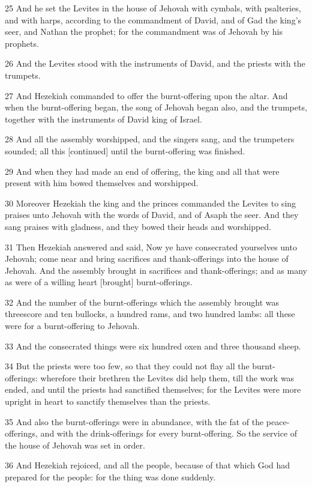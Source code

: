 \par 25 And he set the Levites in the house of Jehovah with cymbals, with psalteries, and with harps, according to the commandment of David, and of Gad the king's seer, and Nathan the prophet; for the commandment was of Jehovah by his prophets.
\par 26 And the Levites stood with the instruments of David, and the priests with the trumpets.
\par 27 And Hezekiah commanded to offer the burnt-offering upon the altar. And when the burnt-offering began, the song of Jehovah began also, and the trumpets, together with the instruments of David king of Israel.
\par 28 And all the assembly worshipped, and the singers sang, and the trumpeters sounded; all this [continued] until the burnt-offering was finished.
\par 29 And when they had made an end of offering, the king and all that were present with him bowed themselves and worshipped.
\par 30 Moreover Hezekiah the king and the princes commanded the Levites to sing praises unto Jehovah with the words of David, and of Asaph the seer. And they sang praises with gladness, and they bowed their heads and worshipped.
\par 31 Then Hezekiah answered and said, Now ye have consecrated yourselves unto Jehovah; come near and bring sacrifices and thank-offerings into the house of Jehovah. And the assembly brought in sacrifices and thank-offerings; and as many as were of a willing heart [brought] burnt-offerings.
\par 32 And the number of the burnt-offerings which the assembly brought was threescore and ten bullocks, a hundred rams, and two hundred lambs: all these were for a burnt-offering to Jehovah.
\par 33 And the consecrated things were six hundred oxen and three thousand sheep.
\par 34 But the priests were too few, so that they could not flay all the burnt-offerings: wherefore their brethren the Levites did help them, till the work was ended, and until the priests had sanctified themselves; for the Levites were more upright in heart to sanctify themselves than the priests.
\par 35 And also the burnt-offerings were in abundance, with the fat of the peace-offerings, and with the drink-offerings for every burnt-offering. So the service of the house of Jehovah was set in order.
\par 36 And Hezekiah rejoiced, and all the people, because of that which God had prepared for the people: for the thing was done suddenly.

